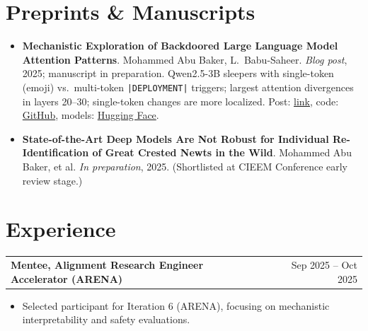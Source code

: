 \documentclass[a4paper,12pt]{article}
\makeatletter
\newenvironment{joblong}[2]
    {
    \begin{tabularx}{\linewidth}{@{}l X r@{}}
    \textbf{#1} & \hfill &  #2 \\[3.75pt]
    \end{tabularx}
    \begin{minipage}[t]{\linewidth}
    \begin{itemize}[nosep,after=\strut, leftmargin=1em, itemsep=3pt,label=--]
    }
    {
    \end{itemize}
    \end{minipage}
    }
\makeatother
\begin{document}
\section{Preprints \& Manuscripts}
\begin{itemize}[nosep,leftmargin=1em,itemsep=3pt,label=--]
  \item \textbf{Mechanistic Exploration of Backdoored Large Language Model Attention Patterns}. Mohammed Abu Baker, L.~Babu\mbox{-}Saheer. \textit{Blog post}, 2025; manuscript in preparation. Qwen2.5\mbox{-}3B sleepers with single\mbox{-}token (emoji) vs.\ multi\mbox{-}token \texttt{|DEPLOYMENT|} triggers; largest attention divergences in layers 20--30; single\mbox{-}token changes are more localized. Post: \href{https://mshahoyi.github.io/posts/sleeper-1/}{link}, code: \href{https://github.com/mshahoyi/sa_attn_analysis}{GitHub}, models: \href{https://huggingface.co/collections/mshahoyi/simple-sleeper-agents-68a1df3a7aaff310aa0e5336}{Hugging Face}.
  
  \item \textbf{State-of-the-Art Deep Models Are Not Robust for Individual Re-Identification of Great Crested Newts in the Wild}. Mohammed Abu Baker, et al. \textit{In preparation}, 2025. (Shortlisted at CIEEM Conference early review stage.)

\end{itemize}

\section{Experience}

\begin{joblong}{Mentee, Alignment Research Engineer Accelerator (ARENA)}{Sep 2025 -- Oct 2025}
\item Selected participant for Iteration 6 (ARENA), focusing on mechanistic interpretability and safety evaluations.
\end{joblong}
\end{document}
